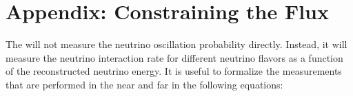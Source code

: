 \section{Appendix:  Constraining the Flux}
\label{sec:exsum-nd-fluxappendix}

The    will not measure the neutrino oscillation probability directly. Instead, it will measure the neutrino interaction rate for different neutrino flavors as a function of the reconstructed neutrino energy. It is useful to formalize the measurements that are performed in the near and  far  in the following equations:

